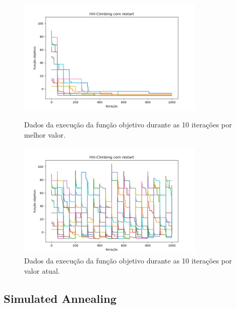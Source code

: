 \begin{figure}[H]
\centering
  \begin{minipage}[b]{0.48\textwidth}
    \includegraphics[width=88mm]{imagens/otima/problema-1-hill-climbing-com-restart-funcao-objetivo-best.png}
    \caption{Dados da execução da função objetivo durante as 10 iterações por melhor valor.
    \label{fig:problema-1-hill-climbing-com-restart-funcao-objetivo-best}}
  \end{minipage}
  \hfill
  \begin{minipage}[b]{0.48\textwidth}
    \includegraphics[width=88mm]{imagens/otima/problema-1-hill-climbing-com-restart-funcao-objetivo-value.png}
    \caption{Dados da execução da função objetivo durante as 10 iterações por valor atual.
    \label{fig:problema-1-hill-climbing-com-restart-funcao-objetivo-value}}
  \end{minipage}
\end{figure}

\subsection{Simulated Annealing}

